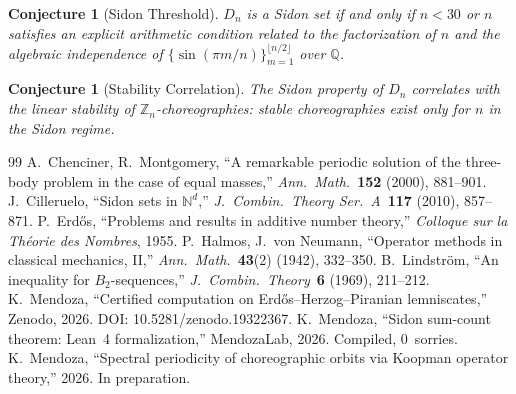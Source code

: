 \documentclass[11pt]{article}
\newtheorem{conjecture}[theorem]{Conjecture}
\theoremstyle{definition}
\theoremstyle{remark}
\begin{document}
\begin{conjecture}[Sidon Threshold]
$D_n$ is a Sidon set if and only if $n < 30$ or $n$ satisfies an explicit arithmetic condition related to the factorization of $n$ and the algebraic independence of $\{\sin(\pi m / n)\}_{m=1}^{\lfloor n/2 \rfloor}$ over $\mathbb{Q}$.
\end{conjecture}

\begin{conjecture}[Stability Correlation]
The Sidon property of $D_n$ correlates with the linear stability of $\mathbb{Z}_n$-choreographies: stable choreographies exist only for $n$ in the Sidon regime.
\end{conjecture}

\begin{thebibliography}{99}
 A.~Chenciner, R.~Montgomery, ``A remarkable periodic solution of the three-body problem in the case of equal masses,'' \emph{Ann.\ Math.}\ \textbf{152} (2000), 881--901.
 J.~Cilleruelo, ``Sidon sets in $\mathbb{N}^d$,'' \emph{J.\ Combin.\ Theory Ser.\ A}\ \textbf{117} (2010), 857--871.
 P.~Erd\H{o}s, ``Problems and results in additive number theory,'' \emph{Colloque sur la Th\'eorie des Nombres}, 1955.
 P.~Halmos, J.~von Neumann, ``Operator methods in classical mechanics, II,'' \emph{Ann.\ Math.}\ \textbf{43}(2) (1942), 332--350.
 B.~Lindstr\"om, ``An inequality for $B_2$-sequences,'' \emph{J.\ Combin.\ Theory}\ \textbf{6} (1969), 211--212.
 K.~Mendoza, ``Certified computation on Erd\H{o}s--Herzog--Piranian lemniscates,'' Zenodo, 2026. DOI: 10.5281/zenodo.19322367.
 K.~Mendoza, ``Sidon sum-count theorem: Lean~4 formalization,'' MendozaLab, 2026. Compiled, 0~sorries.
 K.~Mendoza, ``Spectral periodicity of choreographic orbits via Koopman operator theory,'' 2026. In preparation.
\end{thebibliography}
\end{document}
